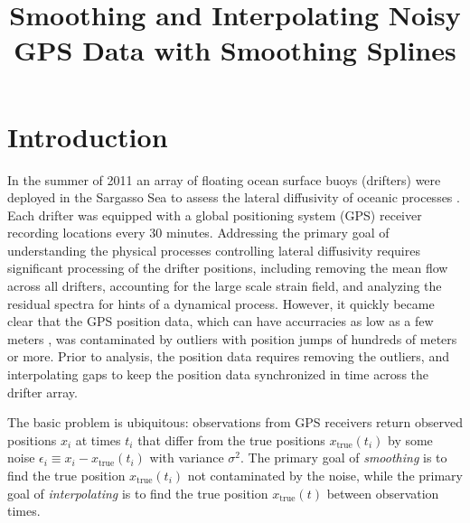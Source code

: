 \documentclass{ametsoc}
\title{Smoothing and Interpolating Noisy GPS Data with Smoothing Splines}
\affiliation{}
\begin{document}
\maketitle



%
\section{Introduction}
%
In the summer of 2011 an array of floating ocean surface buoys (drifters) were deployed in the Sargasso Sea to assess the lateral diffusivity of oceanic processes \citep{shcherbina2015-bams}. Each drifter was equipped with a global positioning system (GPS) receiver recording locations every 30 minutes.
Addressing the primary goal of understanding the physical processes controlling lateral diffusivity requires significant processing of the drifter positions, including removing the mean flow across all drifters, accounting for the large scale strain field, and analyzing the residual spectra for hints of a dynamical process. However, it quickly became clear that the GPS position data, which can have accurracies as low as a few meters \citep{faa2016-report}, was contaminated by outliers with position jumps of hundreds of meters or more. Prior to analysis, the position data requires removing the outliers, and interpolating gaps to keep the position data synchronized in time across the drifter array.

The basic problem is ubiquitous: observations from GPS receivers return observed positions $x_i$ at times $t_i$ that differ from the true positions $x_{\textrm{true}}(t_i)$ by some noise $\epsilon_i \equiv x_i - x_{\textrm{true}}(t_i)$ with variance $\sigma^2$. The primary goal of \emph{smoothing} is to find the true position $x_{\textrm{true}}(t_i)$ not contaminated by the noise, while the primary goal of \emph{interpolating} is to find the true position $x_{\textrm{true}}(t)$ between observation times.
\end{document}
